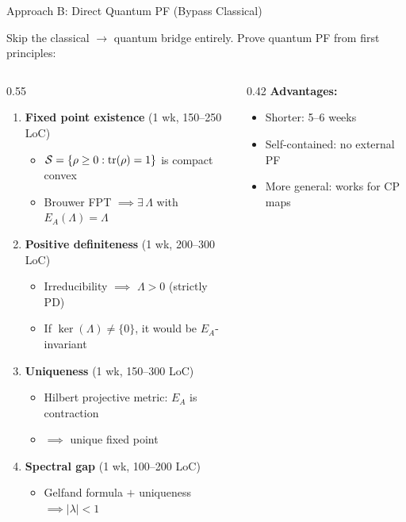 \documentclass[aspectratio=169,10pt]{beamer}
\begin{document}
\begin{frame}{Approach B: Direct Quantum PF (Bypass Classical)}

Skip the classical $\to$ quantum bridge entirely. Prove quantum PF from first principles:

\vspace{0.3em}
\begin{columns}[T]
\begin{column}{0.55\textwidth}
\begin{enumerate}\small\itemsep2pt
  \item \textbf{Fixed point existence} (1 wk, 150--250 LoC)
    \begin{itemize}\scriptsize\itemsep0pt
      \item $\mathcal{S} = \{\rho \geq 0 : \mathrm{tr}(\rho)=1\}$ is compact convex
      \item Brouwer FPT $\implies \exists\,\Lambda$ with $E_A(\Lambda)=\Lambda$
    \end{itemize}
  \item \textbf{Positive definiteness} (1 wk, 200--300 LoC)
    \begin{itemize}\scriptsize\itemsep0pt
      \item Irreducibility $\implies$ $\Lambda > 0$ (strictly PD)
      \item If $\ker(\Lambda) \neq \{0\}$, it would be $E_A$-invariant
    \end{itemize}
  \item \textbf{Uniqueness} (1 wk, 150--300 LoC)
    \begin{itemize}\scriptsize\itemsep0pt
      \item Hilbert projective metric: $E_A$ is contraction
      \item $\implies$ unique fixed point
    \end{itemize}
  \item \textbf{Spectral gap} (1 wk, 100--200 LoC)
    \begin{itemize}\scriptsize\itemsep0pt
      \item Gelfand formula $+$ uniqueness $\implies |\lambda| < 1$
    \end{itemize}
\end{enumerate}
\end{column}
\begin{column}{0.42\textwidth}
\textbf{Advantages:}
\begin{itemize}\small\itemsep1pt
  \item \textcolor{leangreen}{Shorter}: 5--6 weeks
  \item \textcolor{leangreen}{Self-contained}: no external PF
  \item \textcolor{leangreen}{More general}: works for CP maps
\end{itemize}


\end{column}
\end{columns}
\end{frame}
\end{document}

